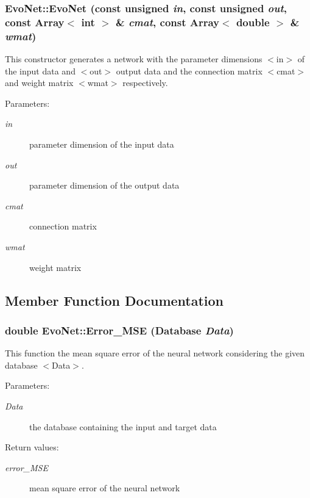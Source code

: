 \subsubsection{\setlength{\rightskip}{0pt plus 5cm}Evo\-Net::Evo\-Net (const unsigned {\em in}, const unsigned {\em out}, const Array$<$ int $>$ \& {\em cmat}, const Array$<$ double $>$ \& {\em wmat})}\label{classEvoNet_a3}


This constructor generates a network with the parameter dimensions $<$in$>$ of the input data and $<$out$>$ output data and the connection matrix $<$cmat$>$ and weight matrix $<$wmat$>$ respectively.

\begin{Desc}
\item[Parameters: ]\par
\begin{description}
\item[{\em 
in}]parameter dimension of the input data \item[{\em 
out}]parameter dimension of the output data \item[{\em 
cmat}]connection matrix \item[{\em 
wmat}]weight matrix \end{description}
\end{Desc}


\subsection{Member Function Documentation}
\subsubsection{\setlength{\rightskip}{0pt plus 5cm}double Evo\-Net::Error\_\-MSE (Database {\em Data})}\label{classEvoNet_a7}


This function the mean square error of the neural network considering the given database $<$Data$>$.

\begin{Desc}
\item[Parameters: ]\par
\begin{description}
\item[{\em 
Data}]the database containing the input and target data \end{description}
\end{Desc}
\begin{Desc}
\item[Return values: ]\par
\begin{description}
\item[{\em 
error\_\-MSE}]mean square error of the neural network \end{description}
\end{Desc}
